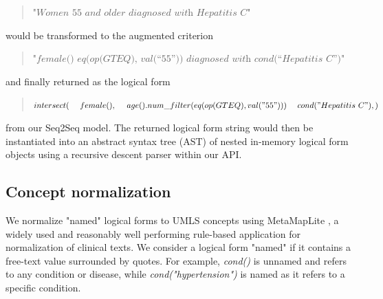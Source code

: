 \documentclass[../main.tex]{subfiles}
\begin{document}
\begin{quote}
    $\textit{"Women 55 and older diagnosed with Hepatitis C"}$
\end{quote}

\noindent would be transformed to the augmented criterion

\begin{quote}
    $\textit{"female() eq(op(GTEQ), val(“55”)) diagnosed with cond(“Hepatitis C”)"}$
\end{quote}

\noindent and finally returned as the logical form

\begin{quote}
$intersect( \\
    \mathrm{\ \ \ \ }female(),\\
    \mathrm{\ \ \ \ }age().num\_filter(eq(op(GTEQ), val("55"))) \\
    \mathrm{\ \ \ \ }cond("Hepatitis\mathrm{\ }C"), \\
)$
\end{quote}

\noindent from our Seq2Seq model. The returned logical form string would then be instantiated into an abstract syntax tree (AST) of nested in-memory logical form objects using a recursive descent parser \cite{johnstone1998generalised} within our API.

\subsection{Concept normalization}

We normalize "named" logical forms to UMLS concepts using MetaMapLite \cite{aronson2001effective, demner2017metamap}, a widely used and reasonably well performing rule-based application for normalization of clinical texts. We consider a logical form "named" if it contains a free-text value surrounded by quotes. For example, \textit{cond()} is unnamed and refers to any condition or disease, while \textit{cond("hypertension")} is named as it refers to a specific condition. 
\end{document}

